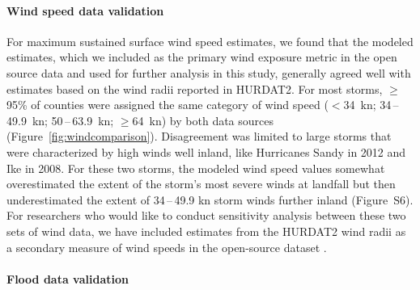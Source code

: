 \paragraph{Wind speed data validation}

For maximum sustained surface wind speed estimates, we found that the modeled
estimates, which we included as the primary wind exposure metric in the open
source data and used for further analysis in this study, generally agreed well
with estimates based on the wind radii reported in \ac{HURDAT2}. For most
storms, $\ge$95\% of counties were assigned the same category of wind speed
($<$34~\si{\knot}; 34\,--\,49.9~\si{\knot}; 50\,--\,63.9~\si{\knot};
$\ge$64~\si{\knot}) by both data sources (Figure~\ref{fig:windcomparison}).
Disagreement was limited to large storms that were characterized by high winds
well inland, like Hurricanes Sandy in 2012 and Ike in 2008. For these two
storms, the modeled wind speed values somewhat overestimated the extent of the
storm's most severe winds at landfall but then underestimated the extent of
34\,--\,49.9 \si{\knot} storm winds further inland (Figure~S6). For researchers
who would like to conduct sensitivity analysis between these two sets of wind
data, we have included estimates from the \ac{HURDAT2} wind radii as a
secondary measure of wind speeds in the open-source dataset
\parencite{hurricaneexposuredata}.

\paragraph{Flood data validation}

